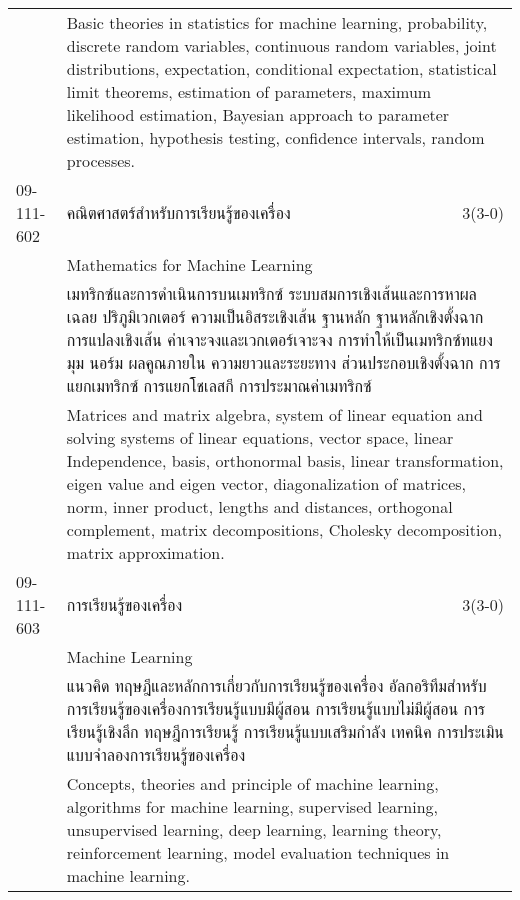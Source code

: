 \begin{longtable}{p{}p{}r{}}
&  \multicolumn{2}{p{0.75\textwidth}}{Basic theories in statistics for machine learning, probability, discrete random variables, continuous random variables, joint distributions, expectation, conditional expectation, statistical limit theorems, estimation of parameters, maximum likelihood estimation, Bayesian approach to parameter estimation, hypothesis testing, confidence intervals, random processes.} \vspace{8mm} \\*
09-111-602 & คณิตศาสตร์สำหรับการเรียนรู้ของเครื่อง & 3(3-0)\\*
 & Mathematics for Machine Learning & \phantom{x} \vspace{3mm} \\*
&  \multicolumn{2}{p{0.75\textwidth}}{เมทริกซ์และการดำเนินการบนเมทริกซ์ ระบบสมการเชิงเส้นและการหาผลเฉลย ปริภูมิเวกเตอร์ ความเป็นอิสระเชิงเส้น ฐานหลัก ฐานหลักเชิงตั้งฉาก การแปลงเชิงเส้น ค่าเจาะจงและเวกเตอร์เจาะจง การทำให้เป็นเมทริกซ์ทแยงมุม นอร์ม ผลคูณภายใน ความยาวและระยะทาง ส่วนประกอบเชิงตั้งฉาก การแยกเมทริกซ์ การแยกโชเลสกี การประมาณค่าเมทริกซ์} \vspace{3mm} \\*
&  \multicolumn{2}{p{0.75\textwidth}}{Matrices and matrix algebra, system of linear equation and solving systems of linear equations, vector space, linear Independence, basis, orthonormal basis, linear transformation, eigen value and eigen vector, diagonalization of matrices, norm, inner product, lengths and distances, orthogonal complement, matrix decompositions, Cholesky decomposition, matrix approximation.} \vspace{8mm} \\*
09-111-603 & การเรียนรู้ของเครื่อง & 3(3-0)\\*
 & Machine Learning & \phantom{x} \vspace{3mm} \\*
&  \multicolumn{2}{p{0.75\textwidth}}{แนวคิด ทฤษฎีและหลักการเกี่ยวกับการเรียนรู้ของเครื่อง อัลกอริทึมสำหรับการเรียนรู้ของเครื่องการเรียนรู้แบบมีผู้สอน การเรียนรู้แบบไม่มีผู้สอน การเรียนรู้เชิงลึก ทฤษฎีการเรียนรู้ การเรียนรู้แบบเสริมกำลัง เทคนิค การประเมินแบบจำลองการเรียนรู้ของเครื่อง} \vspace{3mm} \\*
&  \multicolumn{2}{p{0.75\textwidth}}{Concepts, theories and principle of machine learning, algorithms for machine learning, supervised learning, unsupervised learning, deep learning, learning theory, reinforcement learning, model evaluation techniques in machine learning.} \vspace{8mm} \\*

\end{longtable}
